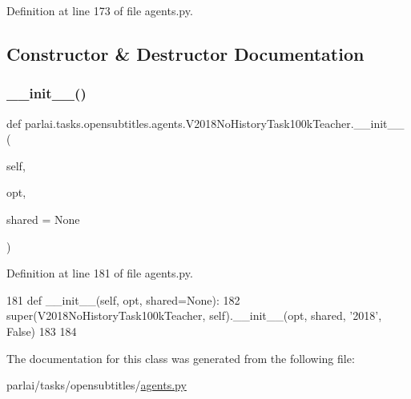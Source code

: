 Definition at line 173 of file agents.\+py.



\subsection{Constructor \& Destructor Documentation}
\mbox{\label{classparlai_1_1tasks_1_1opensubtitles_1_1agents_1_1V2018NoHistoryTask100kTeacher_ac0ca125ef0f17779db17f4ad044294e6}} 
\subsubsection{\texorpdfstring{\+\_\+\+\_\+init\+\_\+\+\_\+()}{\_\_init\_\_()}}
{\footnotesize\ttfamily def parlai.\+tasks.\+opensubtitles.\+agents.\+V2018\+No\+History\+Task100k\+Teacher.\+\_\+\+\_\+init\+\_\+\+\_\+ (\begin{DoxyParamCaption}\item[{}]{self,  }\item[{}]{opt,  }\item[{}]{shared = {\ttfamily None} }\end{DoxyParamCaption})}



Definition at line 181 of file agents.\+py.


\begin{DoxyCode}
181     \textcolor{keyword}{def }\_\_init\_\_(self, opt, shared=None):
182         super(V2018NoHistoryTask100kTeacher, self).\_\_init\_\_(opt, shared, \textcolor{stringliteral}{'2018'}, \textcolor{keyword}{False})
183 
184 
\end{DoxyCode}


The documentation for this class was generated from the following file\+:\begin{DoxyCompactItemize}
\item 
parlai/tasks/opensubtitles/\hyperlink{parlai_2tasks_2opensubtitles_2agents_8py}{agents.\+py}\end{DoxyCompactItemize}
